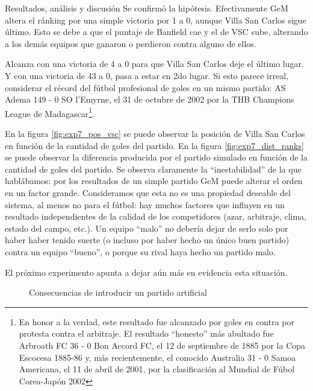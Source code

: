\begin{LaTeXdescription}
    \item[Resultados, an\'alisis y discusi\'on]
        Se confirmó la hipótesis. Efectivamente GeM altera el ránking por una simple victoria por 1 a 0, aunque Villa San Carlos sigue último. Esto se debe a que el puntaje de Banfield cae y el de VSC sube, alterando a los demás equipos que ganaron o perdieron contra alguno de ellos.
        
        Alcanza con una victoria de 4 a 0 para que Villa San Carlos deje el último lugar. Y con una victoria de 43 a 0, pasa a estar en 2do lugar. Si esto parece irreal, considerar el récord del fútbol profesional de goles en un mismo partido: AS Adema 149 - 0 SO l'Emyrne, el 31 de octubre de 2002 por la THB Champions League de Madagascar\footnote{En honor a la verdad, este resultado fue alcanzado por goles en contra por protesta contra el arbitraje. El resultado ``honesto'' más abultado fue Arbroath FC 36 - 0 Bon Accord FC, el 12 de septiembre de 1885 por la Copa Escocesa 1885-86 y, más recientemente, el conocido Australia 31 - 0 Samoa Americana, el 11 de abril de 2001, por la clasificación al Mundial de Fúbol Corea-Japón 2002}.
        
        En la figura \ref{fig:exp7_pos_vsc} se puede observar la posición de Villa San Carlos en función de la cantidad de goles del partido. En la figura \ref{fig:exp7_dist_ranks} se puede observar la diferencia producida por el partido simulado en función de la cantidad de goles del partido. Se observa claramente la ``inestabilidad'' de la que hablábamos: por los resultados de un simple partido GeM puede alterar el orden en un factor grande. Consideramos que esta no es una propiedad deseable del sistema, al menos no para el fútbol: hay muchos factores que influyen en un resultado independientes de la calidad de los competidores (azar, arbitraje, clima, estado del campo, etc.). Un equipo ``malo'' no debería dejar de serlo solo por haber haber tenido suerte (o incluso por haber hecho un único buen partido) contra un equipo ``bueno'', o porque su rival haya hecho un partido malo.
        
        El próximo experimento apunta a dejar aún más en evidencia esta situación.
\end{LaTeXdescription}

\begin{figure}[!h]
    \centering
    \caption{Consecuencias de introducir un partido artificial}
\end{figure}
\noindent

